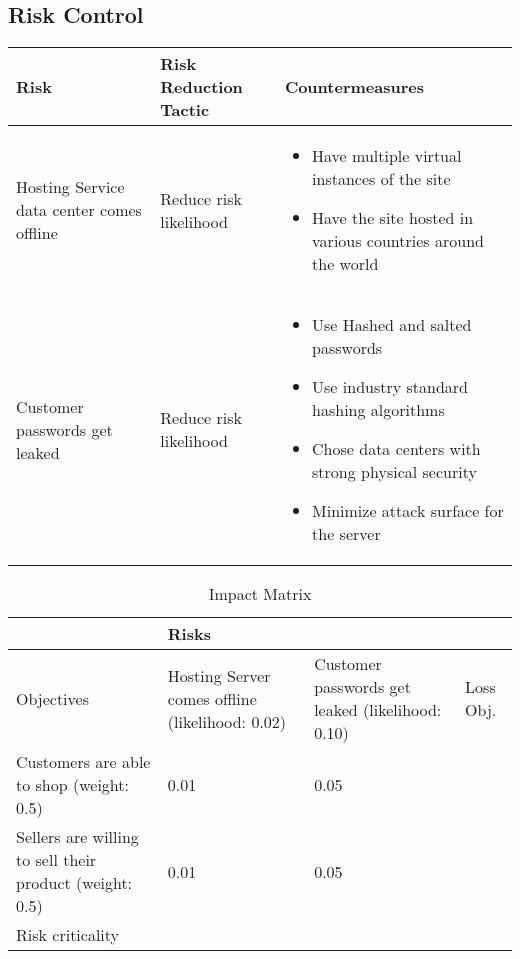 \subsection{Risk Control}
\begin{tabularx}{\textwidth}{|X|X|X|}
\hline
Risk&Risk Reduction Tactic&Countermeasures\\
\hline
Hosting Service data center comes offline&Reduce risk likelihood&
\begin{itemize}
 \item  Have multiple virtual instances of the site
  \item Have the site hosted in various countries around the world
\end{itemize}
 \\
\hline
Customer passwords get leaked&Reduce risk likelihood&
\begin{itemize}
  \item Use Hashed and salted passwords
  \item Use industry standard hashing algorithms
  \item Chose data centers with strong physical security
  \item Minimize attack surface for the server
\end{itemize}\\
\hline
\end{tabularx}
\begin{center}
\begin{table}[!ht]
  \begin{tabularx}{\textwidth}{|X|X|X|X|}
    \hline
    &\multicolumn{3}{X|}{Risks}\\
    \hline
    Objectives&Hosting Server comes offline (likelihood: 0.02)&Customer passwords get leaked (likelihood: 0.10)&Loss Obj.\\
    \hline
    Customers are able to shop (weight: 0.5)&0.01&0.05&\\
    \hline
    Sellers are willing to sell their product (weight: 0.5)&0.01&0.05&\\
    \hline
    Risk criticality&&&\\
    \hline
  \end{tabularx}
  \caption{Impact Matrix}
  \label{tab:impact-matrix}
\end{table}
\end{center}
